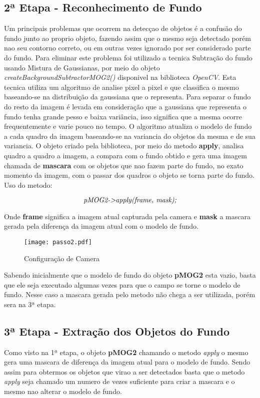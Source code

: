 	\subsection{2ª Etapa - Reconhecimento de Fundo}
	Um principais problemas que ocorrem na detecçao de objetos é a confusão do fundo junto ao proprio objeto, fazendo assim que o mesmo seja detectado porém nao seu contorno correto, ou em outras vezes ignorado por ser considerado parte do fundo. Para eliminar este problema foi utilizado a tecnica  Subtração do fundo usando Mistura de Gaussianas, por meio do objeto \textit{createBackgroundSubtractorMOG2()} disponivel na biblioteca \textit{OpenCV}. Esta tecnica utiliza um algoritmo de analise pixel a pixel e que classifica o mesmo baseando-se na distribuição da gaussiana que o representa. Para separar o fundo do resto da imagem é levada em consideração que a gaussiana que representa o fundo tenha grande pesso e baixa variância, isso significa que a mesma ocorre frequentemente e varie pouco no tempo. O algoritmo atualiza o modelo de fundo a cada quadro da imagem baseando-se na variancia do objetos da mesma e de sua variancia. O objeto criado pela biblioteca, por meio do metodo \textbf{apply}, analisa quadro a quadro a imagem, a compara com o fundo obtido e gera uma imagem chamada de \textbf{mascara} com os objetos que nao fazem parte do fundo, no exato momento da imagem, com o passar dos quadros o objeto se torna parte do fundo. Uso do metodo:
\begin{center}
 \begin{displaymath}  \centering \textit{pMOG2->apply(frame, mask);}  \end{displaymath}
\end{center}

Onde \textbf{frame} significa a imagem atual capturada pela camera e \textbf{mask} a mascara gerada pela diferença da imagem atual com o modelo de fundo. 

\begin{figure}[H]
			\centering
			\texttt{[image: passo2.pdf]}
			\caption{Configuração de Camera}
			\label{Configuracao}
		\end{figure}		


Sabendo inicialmente que o modelo de fundo do objeto \textbf{pMOG2} esta vazio, basta que ele seja executado algumas vezes para que o campo se torne o modelo de fundo. Nesse caso a mascara gerada pelo metodo não chega a ser utilizada, porém sera na 3ª etapa.
	\subsection{3ª Etapa - Extração dos Objetos do Fundo}
	Como visto na 1ª etapa, o objeto \textbf{pMOG2} chamando o metodo \textit{apply} o mesmo gera uma mascara de diferença da imagem atual para o modelo de fundo. Sendo assim para obtermos os objetos que virao a ser detectados basta que o metodo \textit{apply} seja chamado um numero de vezes suficiente para criar a mascara e o mesmo nao alterar o modelo de fundo.
	
